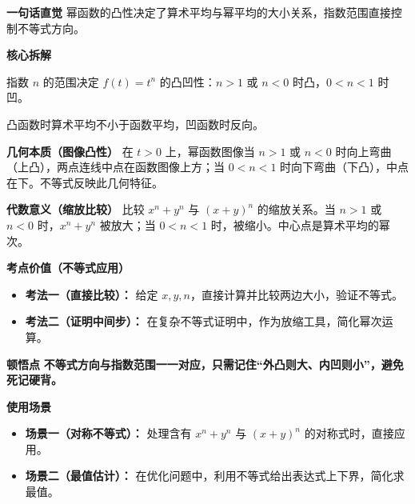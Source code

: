 \begin{explanationbox}
\textbf{\textcolor{CExplanation}{一句话直觉}}
幂函数的凸性决定了算术平均与幂平均的大小关系，指数范围直接控制不等式方向。

\medskip
\textbf{\textcolor{CExplanation}{核心拆解}}
\begin{description}[style=nextline, leftmargin=2.8em, labelsep=0.5em, itemsep=0.45em]
    \item[\textbf{要点一（指数定凸凹）：}] 指数 $n$ 的范围决定 $f(t)=t^n$ 的凸凹性：$n>1$ 或 $n<0$ 时凸，$0<n<1$ 时凹。
    \item[\textbf{要点二（凸凹控方向）：}] 凸函数时算术平均不小于函数平均，凹函数时反向。
\end{description}

\medskip
\textbf{\textcolor{CExplanation}{几何本质（图像凸性）}}
在 $t>0$ 上，幂函数图像当 $n>1$ 或 $n<0$ 时向上弯曲（上凸），两点连线中点在函数图像上方；当 $0<n<1$ 时向下弯曲（下凸），中点在下。不等式反映此几何特征。

\medskip
\textbf{\textcolor{CExplanation}{代数意义（缩放比较）}}
比较 $x^n+y^n$ 与 $(x+y)^n$ 的缩放关系。当 $n>1$ 或 $n<0$ 时，$x^n+y^n$ 被放大；当 $0<n<1$ 时，被缩小。中心点是算术平均的幂次。

\medskip
\textbf{\textcolor{CExplanation}{考点价值（不等式应用）}}
\begin{itemize}[leftmargin=*, itemsep=0.5em, topsep=0.4em]
    \item \textbf{考法一（直接比较）：} 给定 $x,y,n$，直接计算并比较两边大小，验证不等式。
    \item \textbf{考法二（证明中间步）：} 在复杂不等式证明中，作为放缩工具，简化幂次运算。
\end{itemize}

\medskip
\textbf{\textcolor{CExplanation}{顿悟点}}
\textbf{不等式方向与指数范围一一对应，只需记住“外凸则大、内凹则小”，避免死记硬背。}

\medskip
\textbf{\textcolor{CExplanation}{使用场景}}
\begin{itemize}[leftmargin=*, itemsep=0.5em, topsep=0.4em]
    \item \textbf{场景一（对称不等式）：} 处理含有 $x^n+y^n$ 与 $(x+y)^n$ 的对称式时，直接应用。
    \item \textbf{场景二（最值估计）：} 在优化问题中，利用不等式给出表达式上下界，简化求最值。
\end{itemize}

\end{explanationbox}
